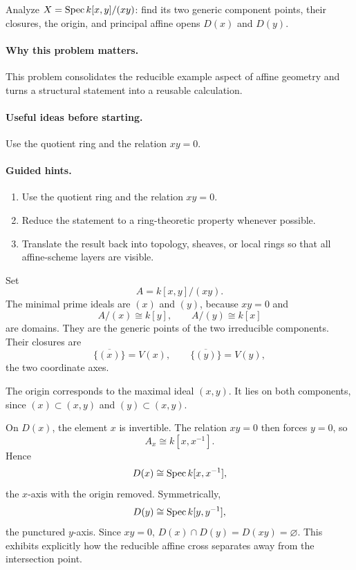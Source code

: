\begin{problem}\label{prob:vi18-p12}
Analyze $X=\operatorname{Spec} k[x,y]/(xy)$: find its two generic component points, their closures, the origin, and principal affine opens $D(x)$ and $D(y)$.
\end{problem}

\ifdefined\FullProblemDossiers
\paragraph{Why this problem matters.}
This problem consolidates the reducible example aspect of affine geometry and turns a structural statement into a reusable calculation.

\paragraph{Useful ideas before starting.}
Use the quotient ring and the relation $xy=0$.

\paragraph{Guided hints.}
\begin{enumerate}
\item Use the quotient ring and the relation $xy=0$.
\item Reduce the statement to a ring-theoretic property whenever possible.
\item Translate the result back into topology, sheaves, or local rings so that all affine-scheme layers are visible.
\end{enumerate}

\begin{solution}
Set
\[
A=k[x,y]/(xy).
\]
The minimal prime ideals are $(x)$ and $(y)$, because $xy=0$ and
\[
A/(x)\cong k[y],\qquad A/(y)\cong k[x]
\]
are domains. They are the generic points of the two irreducible components. Their closures are
\[
\overline{\{(x)\}}=V(x),\qquad
\overline{\{(y)\}}=V(y),
\]
the two coordinate axes.

The origin corresponds to the maximal ideal $(x,y)$. It lies on both components, since $(x)\subset(x,y)$ and $(y)\subset(x,y)$.

On $D(x)$, the element $x$ is invertible. The relation $xy=0$ then forces $y=0$, so
\[
A_x\cong k[x,x^{-1}].
\]
Hence
\[
D(x)\cong\operatorname{Spec} k[x,x^{-1}],
\]
the $x$-axis with the origin removed. Symmetrically,
\[
D(y)\cong\operatorname{Spec} k[y,y^{-1}],
\]
the punctured $y$-axis. Since $xy=0$, $D(x)\cap D(y)=D(xy)=\varnothing$. This exhibits explicitly how the reducible affine cross separates away from the intersection point.
\end{solution}


